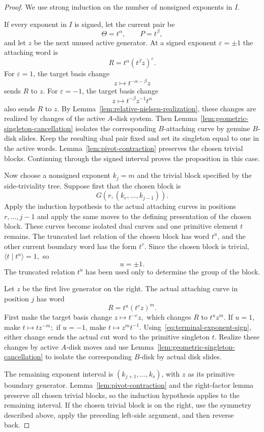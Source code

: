 \documentclass{article}
\begin{document}
\begin{proof}
We use strong induction on the number of nonsigned exponents in $I$.

If every exponent in $I$ is signed, let the current pair be
\[
 \Theta=t^{\alpha},\qquad P=t^{\beta},
\]
and let $z$ be the next unused active generator.  At a signed exponent
$\varepsilon=\pm1$ the attaching word is
\[
 R=t^{\alpha}(t^{\beta}z)^{\varepsilon}.
\]
For $\varepsilon=1$, the target basis change
\[
 z\longmapsto t^{-\alpha-\beta}z
\]
sends $R$ to $z$.  For $\varepsilon=-1$, the target basis change
\[
 z\longmapsto t^{-\beta}z^{-1}t^{\alpha}
\]
also sends $R$ to $z$.  By
Lemma~\ref{lem:relative-nielsen-realization}, these changes are realized by
changes of the active $A$-disk system.  Then
Lemma~\ref{lem:geometric-singleton-cancellation} isolates the corresponding
$B$-attaching curve by genuine $B$-disk slides.  Keep the resulting dual pair
fixed and set its singleton equal to one in the active words.
Lemma~\ref{lem:pivot-contraction} preserves the chosen trivial blocks.
Continuing through the signed interval proves the proposition in this case.

Now choose a nonsigned exponent $k_j=m$ and the trivial block specified by
the side-triviality tree.  Suppose first that the chosen block is
\[
 G(r,(k_r,\ldots,k_{j-1})).
\]
Apply the induction hypothesis to the actual attaching curves in positions
$r,\ldots,j-1$ and apply the same moves to the defining presentation of the
chosen block.  These curves become isolated dual curves and one primitive
element $t$ remains.  The truncated last relation of the chosen block has
word $t^u$, and the other current boundary word has the form $t^v$.  Since
the chosen block is trivial,
\(
 \langle t\mid t^u\rangle=1,
\)
so
\begin{equation}
 u=\pm1.
 \label{eq:terminal-exponent-sign}
\end{equation}
The truncated relation $t^u$ has been used only to determine the group of
the block.

Let $z$ be the first live generator on the right.  The actual attaching
curve in position $j$ has word
\[
 R=t^u(t^vz)^m.
\]
First make the target basis change
\(
 z\longmapsto t^{-v}z,
\)
which changes $R$ to $t^uz^m$.  If $u=1$, make
\(
 t\longmapsto tz^{-m};
\)
if $u=-1$, make
\(
 t\longmapsto z^m t^{-1}.
\)
Using~\eqref{eq:terminal-exponent-sign}, either change sends the actual cut
word to the primitive singleton $t$.  Realize these changes by active
$A$-disk moves and use
Lemma~\ref{lem:geometric-singleton-cancellation} to isolate the corresponding
$B$-disk by actual disk slides.

The remaining exponent interval is $(k_{j+1},\ldots,k_s)$, with $z$ as its
primitive boundary generator.  Lemma~\ref{lem:pivot-contraction} and the
right-factor lemma preserve all chosen trivial blocks, so the induction
hypothesis applies to the remaining interval.  If the chosen trivial block is on the right, use the symmetry described
above, apply the preceding left-side argument, and then reverse back.
\end{proof}
\end{document}
